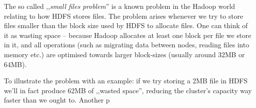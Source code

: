 The so called ,,\textit{small files problem}'' is a known problem in the Hadoop world relating to how HDFS stores files. 
The problem arises whenever we try to store files smaller than the block size used by HDFS to allocate files. One can think of it as wasting space -- because Hadoop allocates at least one block per file we store in it, and all operations (such as migrating data between nodes, reading files into memory etc.) are optimised towards larger block-sizes (usually around 32MB or 64MB). 

To illustrate the problem with an example: if we try storing a 2MB file in HDFS we'll in fact produce 62MB of ,,wasted space'', reducing the cluster's capacity way faster than we ought to. Another p